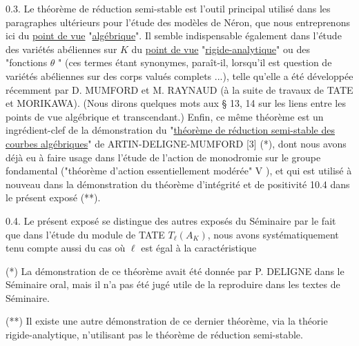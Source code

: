 0.3.  Le théorème de réduction semi-stable est l'outil principal utilisé dans les paragraphes ultérieurs pour l'étude des modèles de Néron, que nous entreprenons ici du \underline{point de vue} "\underline{algébrique}". Il semble indispensable également dans l'étude des variétés abéliennes sur $K$ du \underline{point de vue} "\underline{rigide-analytique}" ou des "fonctions $\theta$ " (ces termes étant synonymes, paraît-il, lorsqu'il est question de variétés abéliennes sur des corps valués complets ...), telle qu'elle a été développée récemment par D. MUMFORD et M. RAYNAUD (à la suite de travaux de TATE et MORIKAWA). (Nous dirons quelques mots aux \S{} 13, 14 sur les liens entre les points de vue algébrique et transcendant.) Enfin, ce même théorème est un ingrédient-clef de la démonstration du "\underline{théorème de réduction semi-stable des courbes algébriques}" de ARTIN-DELIGNE-MUMFORD [3] (*), dont nous avons déjà eu à faire usage dans l'étude de l'action de monodromie sur le groupe fondamental ("théorème d'action essentiellement modérée" V \hspace{2em}), et qui est utilisé à nouveau dans la démonstration du théorème d'intégrité et de positivité 10.4 dans le présent exposé (**).

0.4.  Le présent exposé se distingue des autres exposés du Séminaire par le fait que dans l'étude du module de TATE $T_\ell(A_K)$, nous avons systématiquement tenu compte aussi du cas où $\ell$ est égal à la caractéristique

(*)  La démonstration de ce théorème avait été donnée par P. DELIGNE dans le Séminaire oral, mais il n'a pas été jugé utile de la reproduire dans les textes de Séminaire.

(**) Il existe une autre démonstration de ce dernier théorème, via la théorie rigide-analytique, n'utilisant pas le théorème de réduction semi-stable.



